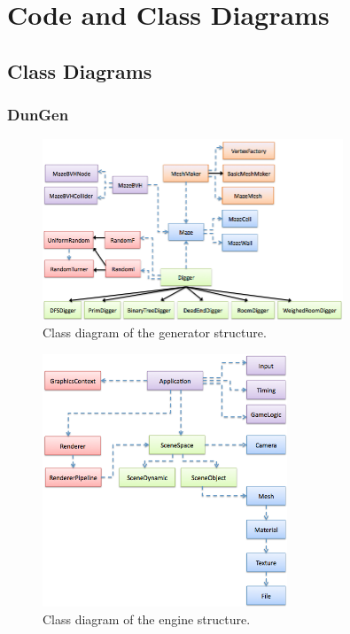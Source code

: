 \chapter{Code and Class Diagrams}
\label{codeDiagrams}

\section{Class Diagrams}
\subsection{DunGen}
\begin{figure}[h!]
\centering
 \includegraphics[width=0.80\textwidth]{images/uml_generator0.png}
\caption{Class diagram of the generator structure.}
\end{figure}

\pagebreak
\begin{figure}[h!]
\centering
 \includegraphics[width=0.65\textwidth]{images/uml_engine0.png}
\caption{Class diagram of the engine structure.}
\end{figure}

